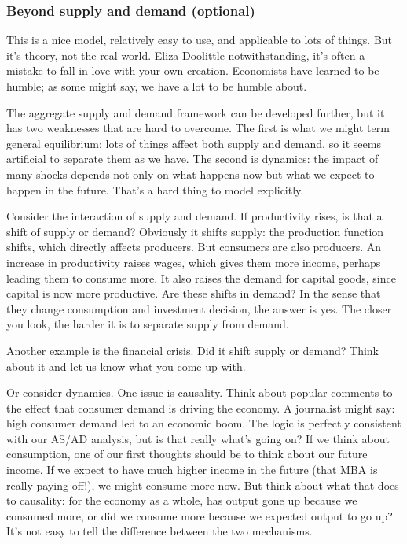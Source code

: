 \documentclass[letterpaper,12pt]{article}
\begin{document}
\subsubsection*{Beyond supply and demand (optional)}

This is a nice model, relatively easy to use,
and applicable to lots of things.
But it's theory, not the real world.
Eliza Doolittle notwithstanding,
it's often a mistake to fall in love with your own creation.
Economists have learned to be humble;
as some might say, we have a lot to be humble about.

The aggregate supply and demand framework can be developed
further, but it has two weaknesses that are hard to overcome.
The first is what we might term general equilibrium:
lots of things affect both supply and demand, so it seems
artificial to separate them as we have.
The second is dynamics:  the impact of many shocks depends
not only on what happens now but what we expect to happen
in the future.
That's a hard thing to model explicitly.

Consider the interaction of supply and demand.
If productivity rises, is that a shift of supply or demand?
Obviously it shifts supply:  the production function shifts,
which directly affects producers.
But consumers are also producers.
An increase in productivity  raises wages,
which gives them more income, perhaps
leading them to consume more.
It also raises the demand for capital goods,
since capital is now more productive.
Are these shifts in demand?
In the sense that they change consumption and investment
decision, the answer is yes.
The closer you look, the harder it is to separate
supply from demand.

Another example is the financial crisis.
Did it shift supply or demand?
Think about it and let us know what you come up with.

Or consider dynamics.
One issue is causality.
Think about popular comments to the effect that
consumer demand is driving the economy.
A journalist might say:  high consumer demand led to an economic boom.
The logic is perfectly consistent with our AS/AD analysis,
but is that really what's going on?
If we think about consumption,
one of our first thoughts should be to think about our future income.
If we expect to have much higher income in the future
(that MBA is really paying off!),
we might consume more now.
But think about what that does to causality:
for the economy as a whole, has output gone up because we consumed
more, or did we consume more because we expected output to go up?
It's not easy to tell the difference between the two mechanisms.
\end{document}
